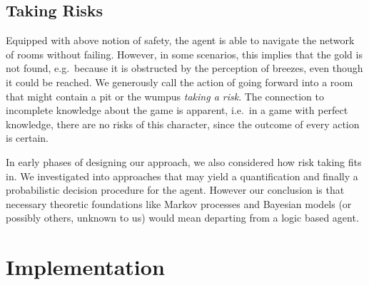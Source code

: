 \documentclass{llncs}
\begin{document}
\subsection{Taking Risks}
Equipped with above notion of safety, the agent is able to navigate the network of rooms without failing. However, in some scenarios, this implies that the gold is not found, e.g.\ because it is obstructed by the perception of breezes, even though it could be reached. We generously call the action of going forward into a room that might contain a pit or the wumpus \emph{taking a risk}. The connection to incomplete knowledge about the game is apparent, i.e.\ in a game with perfect knowledge, there are no risks of this character, since the outcome of every action is certain.

In early phases of designing our approach, we also considered how risk taking fits in. We investigated into approaches that may yield a quantification and finally a probabilistic decision procedure for the agent. However our conclusion is that necessary theoretic foundations like Markov processes and Bayesian models (or possibly others, unknown to us) would mean departing from a logic based agent.


\section{Implementation}
\end{document}
